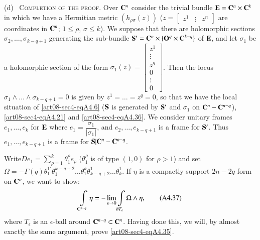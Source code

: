 (d)~ \textsc{Completion of the proof.} Over $\mathbf{C}^{n}$ consider the trivial bundle $\mathbf{E}=\mathbf{C}^{n}\times \mathbf{C}^{k}$ in which we have a Hermitian metric $(h_{\rho\sigma}(z))$ ($z=\left[\begin{smallmatrix} z^{1} & \vdots & z^{n}\end{smallmatrix}\right]$ are coordinates in $\mathbf{C}^{n}$; $1\leq \rho$, $\sigma\leq k$). We suppose that there are holomorphic sections $\sigma_{2},\ldots,\sigma_{k-q+1}$ generating the sub-bundle $\mathbf{S}'=\mathbf{C}^{n}\times \{\mathbf{O}^{q}\times \mathbf{C}^{k-q}\}$ of $\mathbf{E}$, and let $\sigma_{1}$ be a holomorphic section of the form $\sigma_{1}(z)=\left[\begin{smallmatrix} z^{1}\\ \vdots\\ z^{q}\\ 0\\ \vdots\\ 0\end{smallmatrix}\right]$. Then the locus $\sigma_{1}\wedge\ldots\wedge \sigma_{k-q+1}=0$ is given by $z^{1}=\ldots=z^{q}=0$, so that we have the local situation of \eqref{art08-sec4-eqA4.6} ($\mathbf{S}$ is generated by $\mathbf{S}'$ and $\sigma_{1}$ on $\mathbf{C}^{n}-\mathbf{C}^{n-q}$), \eqref{art08-sec4-eqA4.21} and \eqref{art08-sec4-eqA4.36}. We consider unitary frames $e_{1},\ldots,e_{k}$ for $\mathbf{E}$ where $e_{1}=\dfrac{\sigma_{1}}{|\sigma_{1}|}$, and $e_{2},\ldots,e_{k-q+1}$ is a frame for $\mathbf{S}'$. Thus $e_{1},\ldots,e_{k-q+1}$ is a frame for $\mathbf{S} | \mathbf{C}^{n}-\mathbf{C}^{n-q}$.

Write\pageoriginale $De_{1}=\sum\limits^{k}_{\rho=1}\theta^{\rho}_{1}e_{\rho}$ ($\theta^{\rho}_{1}$ is of type $(1,0)$ for $\rho>1$) and set $\Omega=-\Gamma(q)\theta^{1'}_{1}\theta^{k-q+2}_{1}\ldots\theta^{k}_{1}\theta^{1}_{k-q+2}\ldots\theta^{1}_{k}$. If $\eta$ is a compactly support $2n-2q$ form on $\mathbf{C}^{n}$, we want to show:
\begin{equation*}
\int\limits_{\mathbf{C}^{n-q}}\eta=-\lim\limits_{\epsilon\to 0}\int\limits_{\partial T_{\epsilon}}\Omega\wedge \eta,\tag{A4.37}\label{art08-sec4-eqA4.37}
\end{equation*}
where $T_{\epsilon}$ is an $\epsilon$-ball around $\mathbf{C}^{n-q}\subset \mathbf{C}^{n}$. Having done this, we will, by almost exactly the same argument, prove \eqref{art08-sec4-eqA4.35}.


